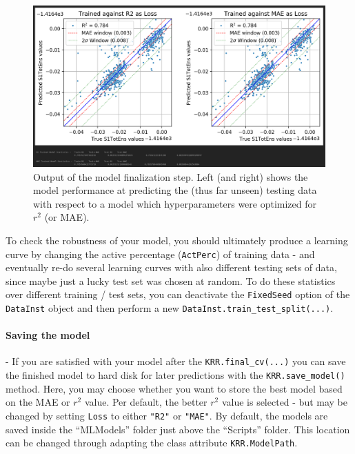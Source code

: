 \documentclass[12pt]{achemso}
\begin{document}
\begin{figure}
  \centering
   \includegraphics[width=12.5cm]{./resources/04_FinalCV_Out.png}
  \caption{Output of the model finalization step. Left (and right) shows the model performance at predicting the (thus far unseen) testing data with respect to a model which hyperparameters were optimized for $r^2$ (or MAE).}
  \label{FIG: 04_FinalCV_Out}
\end{figure}

\noindent To check the robustness of your model, you should ultimately produce a learning curve by changing the active percentage (\texttt{ActPerc}) of training data - and eventually re-do several learning curves with also different testing sets of data, since maybe just a lucky test set was chosen at random. To do these statistics over different training / test sets, you can deactivate the \texttt{FixedSeed} option of the \texttt{DataInst} object and then perform a new \texttt{DataInst.train\_test\_split(...)}.

\paragraph{Saving the model} - If you are satisfied with your model after the \texttt{KRR.final\_cv(...)} you can save the finished model to hard disk for later predictions with the \texttt{KRR.save\_model()} method. Here, you may choose whether you want to store the best model based on the MAE or $r^2$ value. Per default, the better $r^2$ value is selected - but may be changed by setting \texttt{Loss} to either \verb|"R2"| or \verb|"MAE"|. By default, the models are saved inside the ``MLModels'' folder just above the ``Scripts'' folder. This location can be changed through adapting the class attribute \texttt{KRR.ModelPath}.
\end{document}
